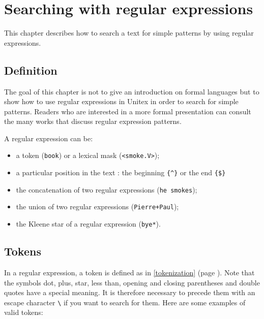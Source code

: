 \chapter{Searching with regular expressions}
\label{chap-regexp}

This chapter describes how to search a text for simple patterns by using regular
expressions.

\section{Definition}

The goal of this chapter is not to give an introduction on formal languages but
to show how to use regular expressions in Unitex in order to search for simple
patterns. Readers who are interested in a more formal presentation can consult
the many works that discuss regular expression patterns.

\bigskip \noindent A regular expression can be:

\begin{itemize}
  \item a token (\verb+book+) or a lexical mask
  (\verb+<smoke.V>+);
  \item a particular position in the text : the beginning \verb+{^}+ or the end \verb+{$}+
  \item the concatenation of two regular
  expressions (\verb+he smokes+);
  \item the union of two regular expressions
  (\verb$Pierre+Paul$); 
  \item the Kleene star of a regular expression
  (\verb+bye*+).
\end{itemize}





\section{Tokens}

In a regular expression, a token is defined as in \ref{tokenization} (page
\pageref{tokenization}). Note that the symbols dot, plus,
star, less than, opening and closing parentheses and double quotes have a
special meaning. It is therefore necessary to precede them with an escape character
\verb+\+ if you want to search for them. Here are some examples of valid
tokens: \index{\verbt{\textbackslash~}}

